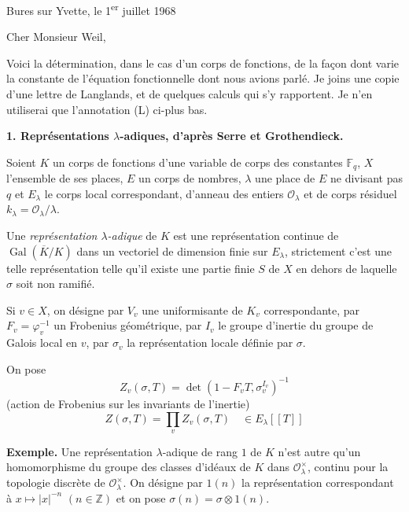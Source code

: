 \documentclass[11pt,a4paper]{article}
\theoremstyle{plain}
\DeclareMathOperator{\Gal}{Gal}
\begin{document}
\begin{flushright}
Bures sur Yvette, le 1\textsuperscript{er} juillet 1968
\end{flushright}

\vspace{0.5cm}

Cher Monsieur Weil,

\vspace{0.3cm}

Voici la d\'etermination, dans le cas d'un corps de fonctions, de la fa\c con dont varie la constante de l'\'equation fonctionnelle dont nous avions parl\'e. Je joins une copie d'une lettre de Langlands, et de quelques calculs qui s'y rapportent. Je n'en utiliserai que l'annotation (L) ci-plus bas.

\vspace{0.5cm}

\noindent\textbf{1. Repr\'esentations $\lambda$-adiques, d'apr\`es Serre et Grothendieck.}

\vspace{0.3cm}

Soient $K$ un corps de fonctions d'une variable de corps des constantes $\mathbb{F}_q$, $X$ l'ensemble de ses places, $E$ un corps de nombres, $\lambda$ une place de $E$ ne divisant pas $q$ et $E_\lambda$ le corps local correspondant, d'anneau des entiers $\mathcal{O}_\lambda$ et de corps r\'esiduel $k_\lambda = \mathcal{O}_\lambda/\lambda$.

Une \emph{repr\'esentation $\lambda$-adique} de $K$ est une repr\'esentation continue de $\Gal(\overline{K}/K)$ dans un vectoriel de dimension finie sur $E_\lambda$, strictement c'est une telle repr\'esentation telle qu'il existe une partie finie $S$ de $X$ en dehors de laquelle $\sigma$ soit non ramifi\'e.

Si $v \in X$, on d\'esigne par $V_v$ une uniformisante de $K_v$ correspondante, par $F_v = \varphi_v^{-1}$ un Frobenius g\'eom\'etrique, par $I_v$ le groupe d'inertie du groupe de Galois local en $v$, par $\sigma_v$ la repr\'esentation locale d\'efinie par $\sigma$.

\vspace{0.5cm}

On pose
\[
Z_v(\sigma, T) = \det(1 - F_v T, \sigma_v^{I_v})^{-1}
\]
(action de Frobenius sur les invariants de l'inertie)
\[
Z(\sigma, T) = \prod_v Z_v(\sigma, T) \quad \in E_\lambda[[T]]
\]

\noindent\textbf{Exemple.} Une repr\'esentation $\lambda$-adique de rang $1$ de $K$ n'est autre qu'un homomorphisme du groupe des classes d'id\'eaux de $K$ dans $\mathcal{O}_\lambda^\times$, continu pour la topologie discr\`ete de $\mathcal{O}_\lambda^\times$. On d\'esigne par $1(n)$ la repr\'esentation correspondant \`a $x \mapsto |x|^{-n}$ $(n \in \mathbb{Z})$ et on pose $\sigma(n) = \sigma \otimes 1(n)$.
\end{document}

